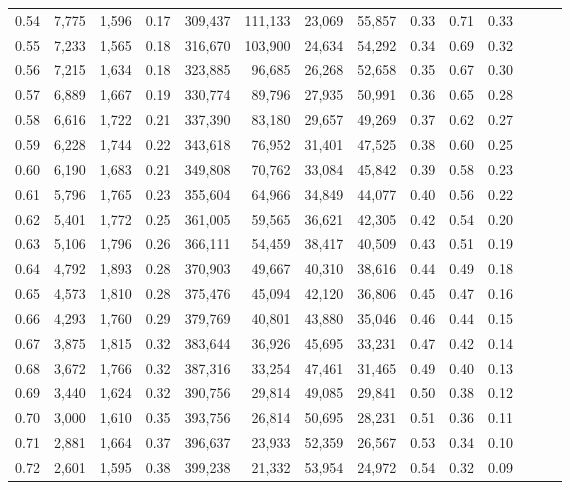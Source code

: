 \begin{tabular}{rrrrrrrrrrrrrr}
0.54 &  7,775 &  1,596 &  0.17 &  309,437 &  111,133 &  23,069 &  55,857 &  0.33 &  0.71 &      0.33 \\
0.55 &  7,233 &  1,565 &  0.18 &  316,670 &  103,900 &  24,634 &  54,292 &  0.34 &  0.69 &      0.32 \\
0.56 &  7,215 &  1,634 &  0.18 &  323,885 &   96,685 &  26,268 &  52,658 &  0.35 &  0.67 &      0.30 \\
0.57 &  6,889 &  1,667 &  0.19 &  330,774 &   89,796 &  27,935 &  50,991 &  0.36 &  0.65 &      0.28 \\
0.58 &  6,616 &  1,722 &  0.21 &  337,390 &   83,180 &  29,657 &  49,269 &  0.37 &  0.62 &      0.27 \\
0.59 &  6,228 &  1,744 &  0.22 &  343,618 &   76,952 &  31,401 &  47,525 &  0.38 &  0.60 &      0.25 \\
0.60 &  6,190 &  1,683 &  0.21 &  349,808 &   70,762 &  33,084 &  45,842 &  0.39 &  0.58 &      0.23 \\
0.61 &  5,796 &  1,765 &  0.23 &  355,604 &   64,966 &  34,849 &  44,077 &  0.40 &  0.56 &      0.22 \\
0.62 &  5,401 &  1,772 &  0.25 &  361,005 &   59,565 &  36,621 &  42,305 &  0.42 &  0.54 &      0.20 \\
0.63 &  5,106 &  1,796 &  0.26 &  366,111 &   54,459 &  38,417 &  40,509 &  0.43 &  0.51 &      0.19 \\
0.64 &  4,792 &  1,893 &  0.28 &  370,903 &   49,667 &  40,310 &  38,616 &  0.44 &  0.49 &      0.18 \\
0.65 &  4,573 &  1,810 &  0.28 &  375,476 &   45,094 &  42,120 &  36,806 &  0.45 &  0.47 &      0.16 \\
0.66 &  4,293 &  1,760 &  0.29 &  379,769 &   40,801 &  43,880 &  35,046 &  0.46 &  0.44 &      0.15 \\
0.67 &  3,875 &  1,815 &  0.32 &  383,644 &   36,926 &  45,695 &  33,231 &  0.47 &  0.42 &      0.14 \\
0.68 &  3,672 &  1,766 &  0.32 &  387,316 &   33,254 &  47,461 &  31,465 &  0.49 &  0.40 &      0.13 \\
0.69 &  3,440 &  1,624 &  0.32 &  390,756 &   29,814 &  49,085 &  29,841 &  0.50 &  0.38 &      0.12 \\
0.70 &  3,000 &  1,610 &  0.35 &  393,756 &   26,814 &  50,695 &  28,231 &  0.51 &  0.36 &      0.11 \\
0.71 &  2,881 &  1,664 &  0.37 &  396,637 &   23,933 &  52,359 &  26,567 &  0.53 &  0.34 &      0.10 \\
0.72 &  2,601 &  1,595 &  0.38 &  399,238 &   21,332 &  53,954 &  24,972 &  0.54 &  0.32 &      0.09 \\

\end{tabular}
